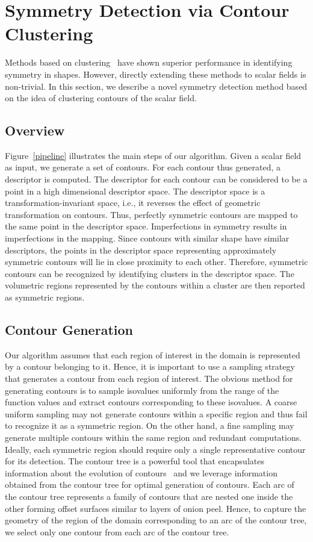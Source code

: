 \documentclass[review,journal]{vgtc}         %
\begin{document}
\section{Symmetry Detection via Contour Clustering}
Methods based on clustering~\cite{Mitra06,Lip10,MitraGP07,Xu12,RavBBK10,Xu09}
have shown superior performance in identifying
symmetry in shapes. However, directly extending these methods to scalar fields
is non-trivial. In this section, we describe a novel symmetry detection method
based on the idea of clustering contours of the scalar field.
\subsection{Overview}
Figure~\ref{pipeline} illustrates the main steps of our algorithm.
Given a scalar field as input, we generate a set of contours. For each contour
thus generated, a descriptor is computed. The descriptor for each contour
can be considered to be a point in a high dimensional 
descriptor space. The descriptor space is a transformation-invariant space,
i.e., it reverses the effect of geometric transformation on contours. Thus, perfectly
symmetric contours are mapped to the same point in the descriptor space.
Imperfections in symmetry results in imperfections in the mapping.
Since contours with similar shape have similar descriptors,
the points in the descriptor space representing approximately symmetric 
contours will lie in close proximity to each other. Therefore, symmetric contours
can be recognized by identifying clusters in the descriptor space. The volumetric
regions represented by the contours within a cluster are then reported as
symmetric regions.
\subsection{Contour Generation}\label{congen}
Our algorithm assumes that each region of interest in the domain is represented by a contour belonging to it.
Hence, it is important to use a sampling strategy that generates a contour from each
region of interest. The obvious method for generating contours is 
to sample isovalues uniformly from the range of the function values and extract contours 
corresponding to these isovalues. A coarse uniform sampling may not generate contours 
within a specific region and thus fail to recognize it as a symmetric region. On the other hand, 
a fine sampling may generate multiple contours within the same region 
and redundant computations. Ideally, each symmetric region should require only a single 
representative contour for its detection.
The contour tree is a powerful tool that encapsulates information about the evolution of contours~\cite{CarrSP10} 
and we leverage information obtained from the contour tree for optimal generation of contours. 
Each arc of the contour tree represents a family of contours that are nested one inside the other
forming offset surfaces similar to layers of onion peel. Hence, to capture the geometry of the region of 
the domain corresponding to an arc of the contour tree, we select only one contour from each 
arc of the contour tree.
\end{document}

